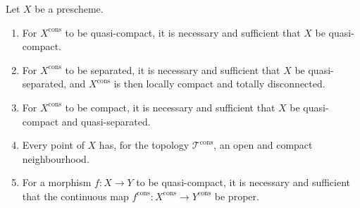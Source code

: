\begin{proposition}[1.9.15]
\label{IV.1.9.15}
Let $X$ be a prescheme.
\begin{enumerate}
  \item[\textup{(i)}] For $X^{\mathrm{cons}}$ to be quasi-compact, it is necessary and
  sufficient that $X$ be quasi-compact.
  \item[\textup{(ii)}] For $X^{\mathrm{cons}}$ to be separated, it is necessary and
  sufficient that $X$ be quasi-separated, and $X^{\mathrm{cons}}$ is then
  locally compact and totally disconnected.
  \item[\textup{(iii)}] For $X^{\mathrm{cons}}$ to be compact, it is necessary and
  sufficient that $X$ be quasi-compact and quasi-separated.
  \item[\textup{(iv)}] Every point of $X$ has, for the topology
  $\mathscr T^{\mathrm{cons}}$, an open and compact neighbourhood.
  \item[\textup{(v)}] For a morphism $f:X\to Y$ to be quasi-compact, it is necessary
  and sufficient that the continuous map
  $f^{\mathrm{cons}}:X^{\mathrm{cons}}\to Y^{\mathrm{cons}}$ be proper.
\end{enumerate}
\end{proposition}

